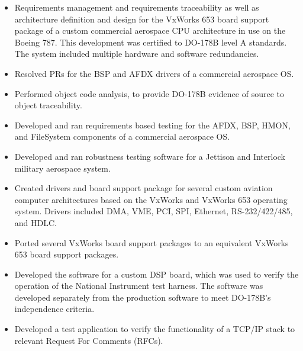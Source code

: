 \documentclass[print]{template/friggeri-cv} %
\begin{document}
\begin{entrylist}
{\begin{itemize}
\begin{itemize}
\item Requirements management and requirements traceability as well as architecture definition and design for the VxWorks 653 board support package of a custom commercial aerospace CPU architecture in use on the Boeing 787.  This development was certified to DO-178B level A standards.  The system included multiple hardware and software redundancies.
\item Resolved PRs for the BSP and AFDX drivers of a commercial aerospace OS.
\item Performed object code analysis, to provide DO-178B evidence of source to object traceability.
\item Developed and ran requirements based testing for the AFDX, BSP, HMON, and FileSystem components of a commercial aerospace OS.
\item Developed and ran robustness testing software for a Jettison and Interlock military aerospace system.
\item Created drivers and board support package for several custom aviation computer architectures based on the VxWorks and VxWorks 653 operating system.  Drivers included DMA, VME, PCI, SPI, Ethernet, RS-232/422/485, and HDLC.
\item Ported several VxWorks board support packages to an equivalent VxWorks 653 board support packages.
\item Developed the software for a custom DSP board, which was used to verify the operation of the National Instrument test harness.  The software was developed separately from the production software to meet DO-178B’s independence criteria.
\item Developed a test application to verify the functionality of a TCP/IP stack to relevant Request For Comments (RFCs).
\end{itemize}
\end{itemize}}

\end{entrylist}

\let\oldclearpage\clearpage
\renewcommand{\clearpage}{}
\let\clearpage\oldclearpage
\end{document}
